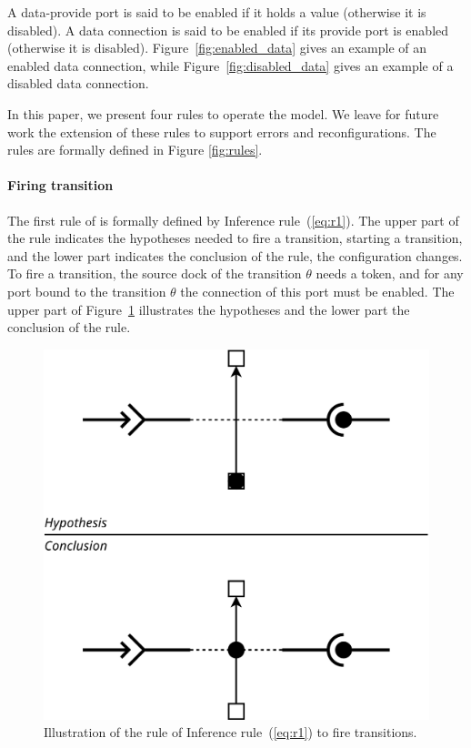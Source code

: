 A data-provide port is said to be enabled if it holds a value (otherwise it is disabled).
A data connection is said to be enabled if its provide port is enabled (otherwise it is
disabled).
Figure~\ref{fig:enabled_data} gives an example of an enabled data connection,
while Figure~\ref{fig:disabled_data} gives an example of a disabled data connection.
    
In this paper, we present four rules to operate the \mad model. We
leave for future work the extension of these rules to support errors
and reconfigurations. The rules are formally defined in
Figure \ref{fig:rules}.

\paragraph{Firing transition}{

The first rule of \mad is formally defined by
Inference rule~(\ref{eq:r1}). The upper part of the rule indicates the
hypotheses needed to fire a transition, \ie starting a transition,
and the lower part indicates the conclusion of the rule, \ie the configuration
changes. To fire a transition, the source dock of the transition
$\theta$ needs a token, and for any port bound to the transition
$\theta$ the connection of this port must be enabled.
The upper part of Figure~\ref{fig:r1} illustrates the
hypotheses and the lower part the conclusion of the rule.

\begin{figure}[t]
\begin{center}
  \includegraphics[width=0.55\columnwidth]{./images/firing.pdf}
\end{center}
\caption{Illustration of the rule of Inference rule~(\ref{eq:r1}) to fire transitions.}
\label{fig:r1}
\end{figure}

}

